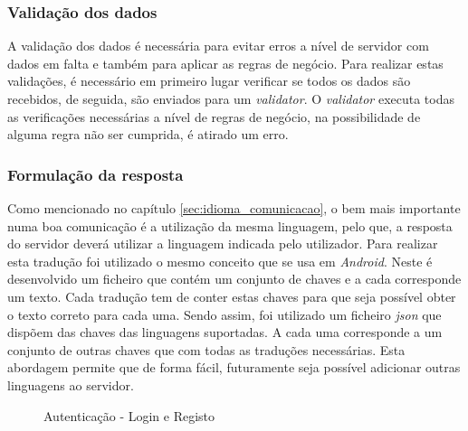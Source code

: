\newpage

\subsubsection{Validação dos dados}
A validação dos dados é necessária para evitar erros a nível de servidor com dados em falta e também para aplicar as regras de negócio. Para realizar estas validações, é necessário em primeiro lugar verificar se todos os dados são recebidos, de seguida, são enviados para um \textit{validator}. O \textit{validator} executa todas as verificações necessárias a nível de regras de negócio, na possibilidade de alguma regra não ser cumprida, é atirado um erro.

\subsubsection{Formulação da resposta}
Como mencionado no capítulo \ref{sec:idioma_comunicacao}, o bem mais importante numa boa comunicação é a utilização da mesma linguagem, pelo que, a resposta do servidor deverá utilizar a linguagem indicada pelo utilizador. Para realizar esta tradução foi utilizado o mesmo conceito que se usa em \textit{Android}. Neste é desenvolvido um ficheiro que contém um conjunto de chaves e a cada corresponde um texto. Cada tradução tem de conter estas chaves para que seja possível obter o texto correto para cada uma. Sendo assim, foi utilizado um ficheiro \textit{\acrshort{json}} que dispõem das chaves das linguagens suportadas. A cada uma corresponde a um conjunto de outras chaves que com todas as traduções necessárias. Esta abordagem permite que de forma fácil, futuramente seja possível adicionar outras linguagens ao servidor.

\begin{figure}[htb]%
 \centering
 \qquad
 \caption{Autenticação - Login e Registo}%
 \label{fig:24}
\end{figure}

